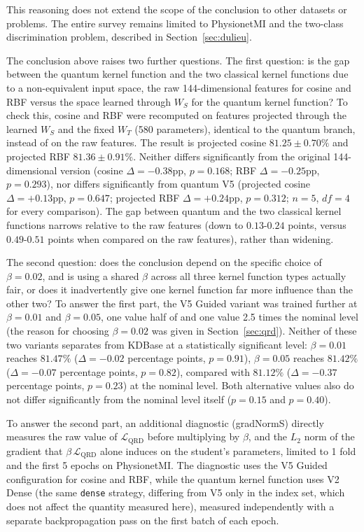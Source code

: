 This reasoning does not extend the scope of the conclusion to other
datasets or problems. The entire survey remains limited to
PhysionetMI and the two-class discrimination problem, described in
Section~\ref{sec:dulieu}.

The conclusion above raises two further questions. The first
question: is the gap between the quantum kernel function and the two
classical kernel functions due to a non-equivalent input space, the
raw 144-dimensional features for cosine and RBF versus the space
learned through $W_S$ for the quantum kernel function? To check
this, cosine and RBF were recomputed on features projected through
the learned $W_S$ and the fixed $W_T$ (580 parameters), identical to
the quantum branch, instead of on the raw features. The result is
projected cosine $81.25\pm0.70\%$ and projected RBF $81.36\pm0.91\%$.
Neither differs significantly from the original 144-dimensional
version (cosine $\Delta=-0.38$pp, $p=0.168$; RBF $\Delta=-0.25$pp,
$p=0.293$), nor differs significantly from quantum V5 (projected
cosine $\Delta=+0.13$pp, $p=0.647$; projected RBF $\Delta=+0.24$pp,
$p=0.312$; $n=5$, $df=4$ for every comparison). The gap between
quantum and the two classical kernel functions narrows relative to
the raw features (down to $0.13$-$0.24$ points, versus $0.49$-$0.51$
points when compared on the raw features), rather than widening.

The second question: does the conclusion depend on the specific
choice of $\beta = 0.02$, and is using a shared $\beta$ across all
three kernel function types actually fair, or does it inadvertently
give one kernel function far more influence than the other two? To
answer the first part, the V5 Guided variant was trained further at
$\beta = 0.01$ and $\beta = 0.05$, one value half of and one value
2.5 times the nominal level (the reason for choosing $\beta = 0.02$
was given in Section~\ref{sec:qrd}). Neither of these two variants
separates from KDBase at a statistically significant level:
$\beta = 0.01$ reaches $81.47\%$ ($\Delta = -0.02$ percentage
points, $p = 0.91$), $\beta = 0.05$ reaches $81.42\%$ ($\Delta =
-0.07$ percentage points, $p = 0.82$), compared with $81.12\%$
($\Delta = -0.37$ percentage points, $p = 0.23$) at the nominal
level. Both alternative values also do not differ significantly
from the nominal level itself ($p = 0.15$ and $p = 0.40$).

To answer the second part, an additional diagnostic (gradNormS)
directly measures the raw value of $\mathcal{L}_{\mathrm{QRD}}$
before multiplying by $\beta$, and the $L_2$ norm of the gradient
that $\beta\,\mathcal{L}_{\mathrm{QRD}}$ alone induces on the
student's parameters, limited to 1 fold and the first 5 epochs on
PhysionetMI. The diagnostic uses the V5 Guided configuration for
cosine and RBF, while the quantum kernel function uses V2 Dense (the
same \texttt{dense} strategy, differing from V5 only in the index
set, which does not affect the quantity measured here), measured
independently with a separate backpropagation pass on the first
batch of each epoch.

